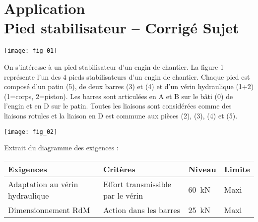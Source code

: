 \chapter*{Application  \\ 
Pied stabilisateur -- \ifprof Corrigé \else Sujet \fi}

\iflivret {} \else
\ifprof  {} \else \fi
\fi

\setcounter{question}{0}
\begin{marginfigure}
\texttt{[image: fig\_01]}
\end{marginfigure}

\ifprof
\else
On s’intéresse à un pied stabilisateur d’un engin de chantier.
La figure 1 représente l’un des 4 pieds stabilisateurs d’un engin de chantier. Chaque pied est composé d’un patin (5), de deux barres (3) et (4) et d’un vérin hydraulique (1+2) (1=corps, 2=piston). Les barres sont articulées en A et B sur le bâti (0) de l’engin et en D sur le patin. Toutes les liaisons sont considérées comme des liaisons rotules et la liaison en D est commune aux pièces (2), (3), (4) et (5).

\begin{center}
\texttt{[image: fig\_02]}\hfill
\end{center}

Extrait du diagramme des exigences :
\begin{center}
\begin{tabular}{llll}
\hline
Exigences & Critères & Niveau & Limite \\
\hline
Adaptation au vérin hydraulique	& Effort transmissible par le vérin  & \SI{60}{kN} & Maxi \\
Dimensionnement RdM & Action dans les barres & \SI{25}{kN} & Maxi \\
\hline
\end{tabular}
\end{center}


